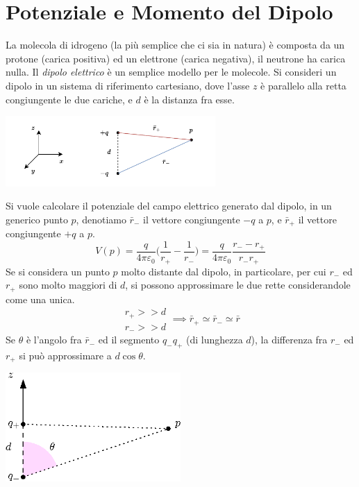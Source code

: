 \documentclass[10pt, letterpaper]{report}
\begin{document}
\flowerLine \section{Potenziale e Momento del Dipolo}
La molecola di idrogeno (la più semplice che ci sia in natura) è composta da un protone (carica positiva) ed un elettrone (carica negativa), il neutrone ha carica nulla. Il \textit{dipolo elettrico} è un semplice modello per le molecole. Si consideri un dipolo in un sistema di riferimento cartesiano, dove l'asse $z$ è parallelo alla retta congiungente le due cariche, e $d$ è la distanza fra esse. 
\begin{center}
    \includegraphics[width=0.6\textwidth]{images/dipoloAsse.drawio.pdf}
\end{center} 
Si vuole calcolare il potenziale del campo elettrico generato dal dipolo, in un generico punto $p$, denotiamo $\bar r_-$ il vettore congiungente $-q$ a $p$, e $\bar r_+$ il vettore congiungente $+q$ a $p$.
$$ V(p)=\frac{q}{4\pi\varepsilon_0}\Big( \frac{1}{r_+}-\frac{1}{r_-} \Big)=\frac{q}{4\pi\varepsilon_0}\frac{r_--r_+}{r_-r_+}$$
Se si considera un punto $p$ molto distante dal dipolo, in particolare, per cui $r_-$ ed $r_+$ sono molto maggiori di $d$, si possono approssimare le due rette considerandole come una unica. 
$$ \begin{matrix}
    r_+>>d\\ 
    r_->>d 
\end{matrix}\implies 
\bar  r_+\simeq \bar  r_- \simeq \bar  r$$
Se $\theta$ è l'angolo fra $\bar r_-$ ed il segmento $q_{-}q_+$ (di lunghezza $d$), la differenza fra $r_-$ ed $r_+$ si può approssimare a $d\cos\theta$.
\begin{center}
    \includegraphics[width=0.5\textwidth]{images/dipoloAsse2.eps}
\end{center} 
\end{document}

